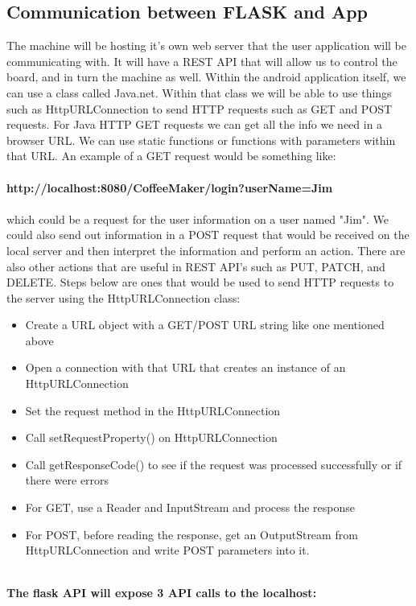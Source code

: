 \documentclass[conference]{IEEEtran}
\begin{document}
\subsection{Communication between FLASK and App}
The machine will be hosting it's own web server that the user application will
be communicating with. It will have a REST API that will allow us to control the
board, and in turn the machine as well. Within the android application itself,
we can use a class called Java.net. Within that class we will be able to use
things such as HttpURLConnection to send HTTP requests such as GET and POST
requests. For Java HTTP GET requests we can get all the info we need in a
browser URL. We can use static functions or functions with parameters within
that URL. An example of a GET request would be something like: \\ \\
\textbf{http://localhost:8080/CoffeeMaker/login?userName=Jim}\\ \\which could
be a request for the user information on a user named "Jim". We could also send
out information in a POST request that would be received on the local server
and then interpret the information and perform an action. There are also other
actions that are useful in REST API's such as PUT, PATCH, and DELETE. Steps
below are ones that would be used to send HTTP requests to the server using the
HttpURLConnection class:
\begin{itemize}
\item Create a URL object with a GET/POST URL string like one mentioned above
\item Open a connection with that URL that creates an instance of an HttpURLConnection
\item Set the request method in the HttpURLConnection
\item Call setRequestProperty() on HttpURLConnection
\item Call getResponseCode() to see if the request was processed successfully or
if there were errors
\item For GET, use a Reader and InputStream and process the response
\item For POST, before reading the response, get an OutputStream from
HttpURLConnection and write POST parameters into it.
\end{itemize} 
\ \\
\textbf{The flask API will expose 3 API calls to the localhost:} \\ 
\end{document}
